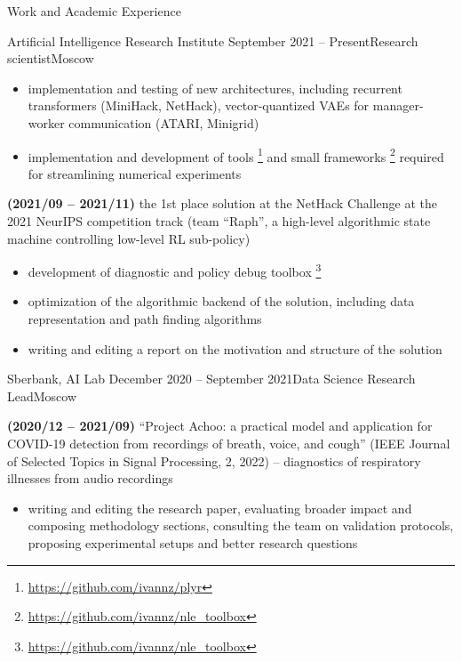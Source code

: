 \documentclass{resume} %
\begin{document}
\begin{rSection}{Work and Academic Experience}
\begin{rSubsection}{
        Artificial Intelligence Research Institute
    }{September 2021 -- Present}{Research scientist}{Moscow}
\begin{itemize}
        \item implementation and testing of new architectures, including recurrent transformers (MiniHack, NetHack), vector-quantized VAEs for manager-worker communication (ATARI, Minigrid)
        
        \item implementation and development of tools%
        \footnote{
            \url{https://github.com/ivannz/plyr}
        }
        and small frameworks%
        \footnote{
            \url{https://github.com/ivannz/nle_toolbox}
        }
        required for streamlining numerical experiments
    \end{itemize}

    \item \textbf{(2021/09 -- 2021/11)}
    the 1st place solution at the NetHack Challenge at the 2021 NeurIPS competition track (team ``Raph'', a high-level algorithmic state machine controlling low-level RL sub-policy)
    \begin{itemize}
        \item development of diagnostic and policy debug toolbox%
        \footnote{
            \url{https://github.com/ivannz/nle_toolbox}
        }

        \item optimization of the algorithmic backend of the solution, including data representation and path finding algorithms

        \item writing and editing a report on the motivation and structure of the solution
    \end{itemize}
\end{rSubsection}

\begin{rSubsection}{
        Sberbank, AI Lab
    }{December 2020 -- September 2021}{Data Science Research Lead}{Moscow}

    \item \textbf{(2020/12 -- 2021/09)}
    ``Project Achoo: a practical model and application for COVID-19 detection from recordings of breath, voice, and cough'' (IEEE Journal of Selected Topics in Signal Processing, 2, 2022) -- diagnostics of respiratory illnesses from audio recordings

    \begin{itemize}
        \item writing and editing the research paper, evaluating broader impact and composing methodology sections, consulting the team on validation protocols, proposing experimental setups and better research questions


\end{itemize}
\end{rSubsection}
\end{rSection}
\end{document}
